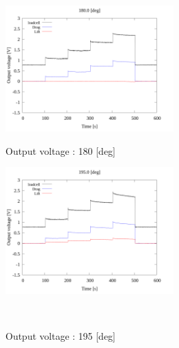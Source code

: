 \begin{figure}[htbp]
      \begin{minipage}[b]{0.45\linewidth}
        \centering
        \includegraphics[width=65mm]{../../02_workspace/result/2-1/plot/01-3_allsensors/01_allsensors_1800.png}
        \caption{Output voltage : 180 [deg]}
      \end{minipage}
      \begin{minipage}[b]{0.45\linewidth}
        \centering
        \includegraphics[width=65mm]{../../02_workspace/result/2-1/plot/01-3_allsensors/01_allsensors_1950.png}
        \caption{Output voltage : 195 [deg]}
      \end{minipage}\\


\end{figure}
